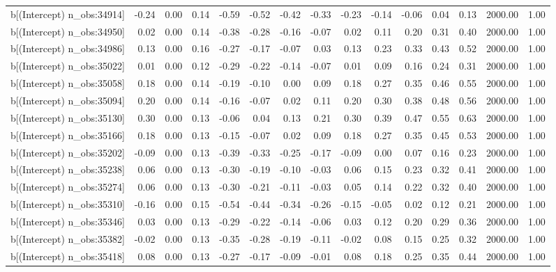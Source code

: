 \begin{table}[ht]
\begin{tabular}{rrrrrrrrrrrrrrr}
  b[(Intercept) n\_obs:34914] & -0.24 & 0.00 & 0.14 & -0.59 & -0.52 & -0.42 & -0.33 & -0.23 & -0.14 & -0.06 & 0.04 & 0.13 & 2000.00 & 1.00 \\ 
  b[(Intercept) n\_obs:34950] & 0.02 & 0.00 & 0.14 & -0.38 & -0.28 & -0.16 & -0.07 & 0.02 & 0.11 & 0.20 & 0.31 & 0.40 & 2000.00 & 1.00 \\ 
  b[(Intercept) n\_obs:34986] & 0.13 & 0.00 & 0.16 & -0.27 & -0.17 & -0.07 & 0.03 & 0.13 & 0.23 & 0.33 & 0.43 & 0.52 & 2000.00 & 1.00 \\ 
  b[(Intercept) n\_obs:35022] & 0.01 & 0.00 & 0.12 & -0.29 & -0.22 & -0.14 & -0.07 & 0.01 & 0.09 & 0.16 & 0.24 & 0.31 & 2000.00 & 1.00 \\ 
  b[(Intercept) n\_obs:35058] & 0.18 & 0.00 & 0.14 & -0.19 & -0.10 & 0.00 & 0.09 & 0.18 & 0.27 & 0.35 & 0.46 & 0.55 & 2000.00 & 1.00 \\ 
  b[(Intercept) n\_obs:35094] & 0.20 & 0.00 & 0.14 & -0.16 & -0.07 & 0.02 & 0.11 & 0.20 & 0.30 & 0.38 & 0.48 & 0.56 & 2000.00 & 1.00 \\ 
  b[(Intercept) n\_obs:35130] & 0.30 & 0.00 & 0.13 & -0.06 & 0.04 & 0.13 & 0.21 & 0.30 & 0.39 & 0.47 & 0.55 & 0.63 & 2000.00 & 1.00 \\ 
  b[(Intercept) n\_obs:35166] & 0.18 & 0.00 & 0.13 & -0.15 & -0.07 & 0.02 & 0.09 & 0.18 & 0.27 & 0.35 & 0.45 & 0.53 & 2000.00 & 1.00 \\ 
  b[(Intercept) n\_obs:35202] & -0.09 & 0.00 & 0.13 & -0.39 & -0.33 & -0.25 & -0.17 & -0.09 & 0.00 & 0.07 & 0.16 & 0.23 & 2000.00 & 1.00 \\ 
  b[(Intercept) n\_obs:35238] & 0.06 & 0.00 & 0.13 & -0.30 & -0.19 & -0.10 & -0.03 & 0.06 & 0.15 & 0.23 & 0.32 & 0.41 & 2000.00 & 1.00 \\ 
  b[(Intercept) n\_obs:35274] & 0.06 & 0.00 & 0.13 & -0.30 & -0.21 & -0.11 & -0.03 & 0.05 & 0.14 & 0.22 & 0.32 & 0.40 & 2000.00 & 1.00 \\ 
  b[(Intercept) n\_obs:35310] & -0.16 & 0.00 & 0.15 & -0.54 & -0.44 & -0.34 & -0.26 & -0.15 & -0.05 & 0.02 & 0.12 & 0.21 & 2000.00 & 1.00 \\ 
  b[(Intercept) n\_obs:35346] & 0.03 & 0.00 & 0.13 & -0.29 & -0.22 & -0.14 & -0.06 & 0.03 & 0.12 & 0.20 & 0.29 & 0.36 & 2000.00 & 1.00 \\ 
  b[(Intercept) n\_obs:35382] & -0.02 & 0.00 & 0.13 & -0.35 & -0.28 & -0.19 & -0.11 & -0.02 & 0.08 & 0.15 & 0.25 & 0.32 & 2000.00 & 1.00 \\ 
  b[(Intercept) n\_obs:35418] & 0.08 & 0.00 & 0.13 & -0.27 & -0.17 & -0.09 & -0.01 & 0.08 & 0.18 & 0.25 & 0.35 & 0.44 & 2000.00 & 1.00 \\ 

\end{tabular}
\end{table}
